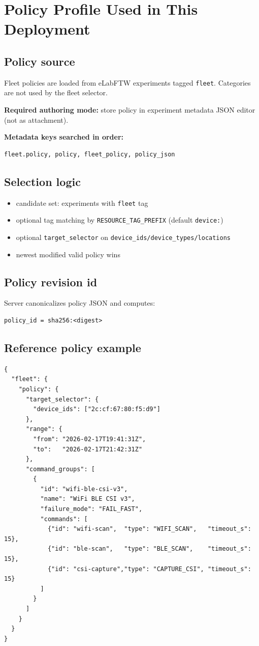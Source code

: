 \documentclass[11pt,a4paper]{article}
\begin{document}
\section{Policy Profile Used in This Deployment}
\subsection{Policy source}
Fleet policies are loaded from eLabFTW experiments tagged \texttt{fleet}.
Categories are not used by the fleet selector.

\textbf{Required authoring mode:}
store policy in experiment metadata JSON editor (not as attachment).

\textbf{Metadata keys searched in order:}
\begin{verbatim}
fleet.policy, policy, fleet_policy, policy_json
\end{verbatim}

\subsection{Selection logic}
\begin{itemize}
  \item candidate set: experiments with \texttt{fleet} tag
  \item optional tag matching by \texttt{RESOURCE\_TAG\_PREFIX} (default \texttt{device:})
  \item optional \texttt{target\_selector} on \texttt{device\_ids/device\_types/locations}
  \item newest modified valid policy wins
\end{itemize}

\subsection{Policy revision id}
Server canonicalizes policy JSON and computes:
\begin{verbatim}
policy_id = sha256:<digest>
\end{verbatim}

\subsection{Reference policy example}
\begin{verbatim}
{
  "fleet": {
    "policy": {
      "target_selector": {
        "device_ids": ["2c:cf:67:80:f5:d9"]
      },
      "range": {
        "from": "2026-02-17T19:41:31Z",
        "to":   "2026-02-17T21:42:31Z"
      },
      "command_groups": [
        {
          "id": "wifi-ble-csi-v3",
          "name": "WiFi BLE CSI v3",
          "failure_mode": "FAIL_FAST",
          "commands": [
            {"id": "wifi-scan",  "type": "WIFI_SCAN",   "timeout_s": 15},
            {"id": "ble-scan",   "type": "BLE_SCAN",    "timeout_s": 15},
            {"id": "csi-capture","type": "CAPTURE_CSI", "timeout_s": 15}
          ]
        }
      ]
    }
  }
}
\end{verbatim}
\end{document}
